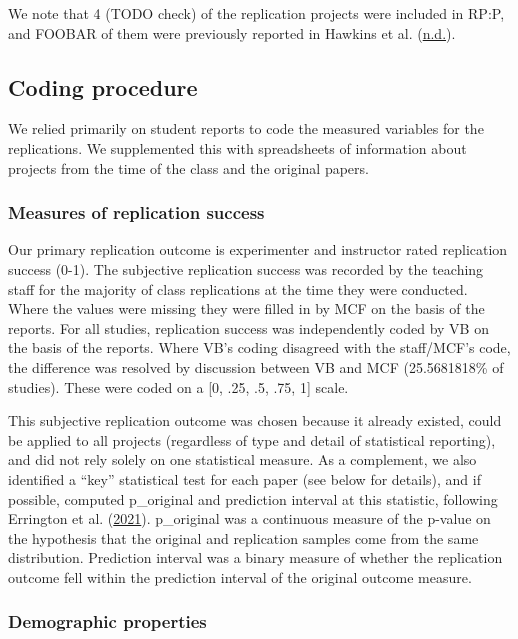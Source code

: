\documentclass[
  english,
  a4paper,
]{article}
\begin{document}
We note that 4 (TODO check) of the replication projects were included in RP:P, and FOOBAR of them were previously reported in Hawkins et al. (\protect\hyperlink{ref-hawkins}{n.d.}).

\hypertarget{coding-procedure}{%
\subsection{Coding procedure}\label{coding-procedure}}

We relied primarily on student reports to code the measured variables for the replications. We supplemented this with spreadsheets of information about projects from the time of the class and the original papers.

\hypertarget{measures-of-replication-success}{%
\subsubsection{Measures of replication success}\label{measures-of-replication-success}}

Our primary replication outcome is experimenter and instructor rated replication success (0-1). The subjective replication success was recorded by the teaching staff for the majority of class replications at the time they were conducted. Where the values were missing they were filled in by MCF on the basis of the reports. For all studies, replication success was independently coded by VB on the basis of the reports. Where VB's coding disagreed with the staff/MCF's code, the difference was resolved by discussion between VB and MCF (25.5681818\% of studies). These were coded on a {[}0, .25, .5, .75, 1{]} scale.

This subjective replication outcome was chosen because it already existed, could be applied to all projects (regardless of type and detail of statistical reporting), and did not rely solely on one statistical measure. As a complement, we also identified a ``key'' statistical test for each paper (see below for details), and if possible, computed p\_original and prediction interval at this statistic, following Errington et al. (\protect\hyperlink{ref-errington2021}{2021}). p\_original was a continuous measure of the p-value on the hypothesis that the original and replication samples come from the same distribution. Prediction interval was a binary measure of whether the replication outcome fell within the prediction interval of the original outcome measure.

\hypertarget{demographic-properties}{%
\subsubsection{Demographic properties}\label{demographic-properties}}
\end{document}
